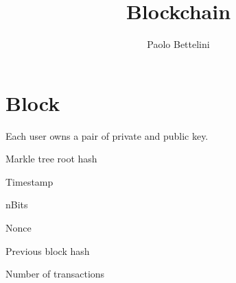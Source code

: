 \documentclass{article}
\title{Blockchain}
\author{Paolo Bettelini}
\date{}
\begin{document}
\maketitle
\tableofcontents
\pagebreak

\section{Block}

Each user owns a pair of private and public key.

\begin{itermize}
    \item Markle tree root hash
    \item Timestamp
    \item nBits
    \item Nonce
    \item Previous block hash
    \item Number of transactions
\end{itermize}

\pagebreak
\end{document}
